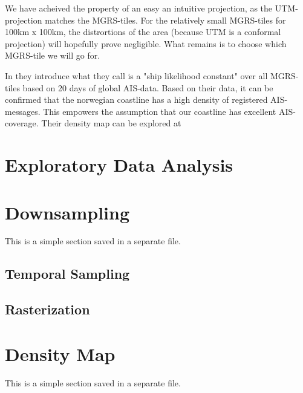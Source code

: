 We have acheived the property of an easy an intuitive projection, as the UTM-projection matches the MGRS-tiles. For the relatively small MGRS-tiles for 100km x 100km, the distrortions of the area (because UTM is a conformal projection) will hopefully prove negligible. What remains is to choose which MGRS-tile we will go for. 

In \cite{Tofting2018} they introduce what they call is a "ship likelihood constant" over all MGRS-tiles based on 20 days of global AIS-data. Based on their data, it can be confirmed that the norwegian coastline has a high density of registered AIS-messages. This empowers the assumption that our coastline has excellent AIS-coverage. Their density map can be explored at \cite{Tofting}


\section{Exploratory Data Analysis}

\section{Downsampling}
\begin{info}{}
	This is a simple section saved in a separate file.
\end{info}
\subsection{Temporal Sampling}
\subsection{Rasterization}






\section{Density Map}
\begin{info}{}
	This is a simple section saved in a separate file.
\end{info}





